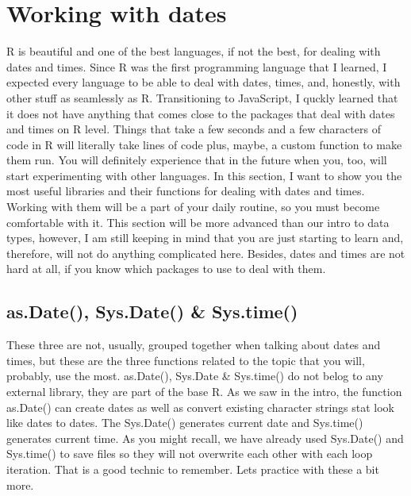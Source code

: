 \documentclass[]{book}
\begin{document}
\hypertarget{working-with-dates}{%
\section{Working with dates}\label{working-with-dates}}

R is beautiful and one of the best languages, if not the best, for dealing with dates and times. Since R was the first programming language that I learned, I expected every language to be able to deal with dates, times, and, honestly, with other stuff as seamlessly as R. Transitioning to JavaScript, I quckly learned that it does not have anything that comes close to the packages that deal with dates and times on R level. Things that take a few seconds and a few characters of code in R will literally take lines of code plus, maybe, a custom function to make them run. You will definitely experience that in the future when you, too, will start experimenting with other languages. In this section, I want to show you the most useful libraries and their functions for dealing with dates and times. Working with them will be a part of your daily routine, so you must become comfortable with it. This section will be more advanced than our intro to data types, however, I am still keeping in mind that you are just starting to learn and, therefore, will not do anything complicated here. Besides, dates and times are not hard at all, if you know which packages to use to deal with them.

\hypertarget{as.date-sys.date-sys.time}{%
\subsection{as.Date(), Sys.Date() \& Sys.time()}\label{as.date-sys.date-sys.time}}

These three are not, usually, grouped together when talking about dates and times, but these are the three functions related to the topic that you will, probably, use the most. as.Date(), Sys.Date \& Sys.time() do not belog to any external library, they are part of the base R. As we saw in the intro, the function as.Date() can create dates as well as convert existing character strings stat look like dates to dates. The Sys.Date() generates current date and Sys.time() generates current time. As you might recall, we have already used Sys.Date() and Sys.time() to save files so they will not overwrite each other with each loop iteration. That is a good technic to remember. Lets practice with these a bit more.
\end{document}
